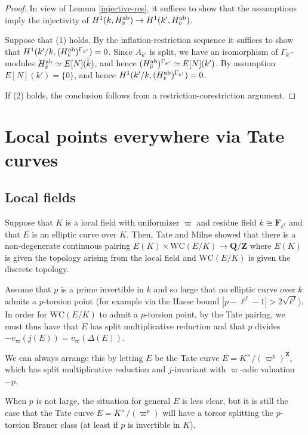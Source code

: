\documentclass[10pt,letterpaper,twoside]{article}
\renewcommand{\1}{\mathbf{1}}
\newcommand{\bF}{\mathbf{F}}
\newcommand{\bQ}{\mathbf{Q}}
\newcommand{\bZ}{\mathbf{Z}}
\newcommand{\WC}{\mathrm{WC}}
\newcommand{\iso}{\cong}
\theoremstyle{plain}
\theoremstyle{plain}
\theoremstyle{definition}
\theoremstyle{named}
\theoremstyle{definition}
\begin{document}
	\begin{proof}
		In view of Lemma \ref{injective-res}, it suffices to show that the assumptions imply the injectivity of $H^1(k,H^{\mathrm{ab}}_{\Bar{v}})\to H^1(k',H^{\mathrm{ab}}_{\Bar{v}})$. 
		
		Suppose that (1) holds. By the inflation-restriction sequence it suffices to show that $H^1(k'/k,(H^{\mathrm{ab}}_{\Bar{v}})^{\Gamma_{k'}})=0$. Since $A_{k'}$ is split, we have an isomorphism of $\Gamma_{k'}$-modules $H^{\mathrm{ab}}_{\Bar{v}}\simeq E[N](\Bar{k})$, and hence  $(H^{\mathrm{ab}}_{\Bar{v}})^{\Gamma_{k'}}\simeq E[N](k')$. By assumption $E[N](k')=\{0\}$, and hence $H^1(k'/k,(H^{\mathrm{ab}}_{\Bar{v}})^{\Gamma_{k'}})=0$.
		
		If (2) holds, the conclusion follows from a restriction-corestriction argument.
	\end{proof}

\section{Local points everywhere via Tate curves}

\subsection{Local fields}

Suppose that $K$ is a local field with uniformizer $\varpi$ and residue field $k\iso\bF_{\ell^f}$ and that $E$ is an elliptic curve over $K$. Then, Tate and Milne 
showed that there is a non-degenerate continuous pairing $E(K)\times\WC(E/K)\rightarrow\bQ/\bZ$
where $E(K)$ is given the topology arising from the local field and $\WC(E/K)$ is given the discrete
topology.

Assume that $p$ is a prime invertible in $k$ and so large that no elliptic curve over $k$ admits
a $p$-torsion point (for example via the Hasse bound $|p-\ell^f-1|>2\sqrt{\ell^f}$).
In order for $\WC(E/K)$ to admit a $p$-torsion point, by the Tate pairing, we must thus have that
$E$ has split multiplicative
reduction and that $p$ divides $-v_{\varpi}(j(E))=v_\varpi(\Delta(E))$.

We can always arrange this by letting $E$ be the Tate curve
$E=K^\times/(\varpi^p)^{\bZ}$, which has split multiplicative reduction
and $j$-invariant with $\varpi$-adic valuation $-p$.

When $p$ is not large, the situation for general $E$ is less clear, but it is still the case that the Tate curve
$E=K^\times/(\varpi^p)$ will have a torsor splitting the $p$-torsion Brauer class (at least if $p$
is invertible in $K$).
\end{document}
